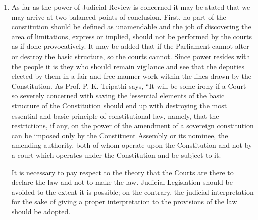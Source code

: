 \begin{multicols}{2}
\begin{enumerate}
\item As far as the power of Judicial Review is concerned it may be stated that we may
arrive at two balanced points of conclusion. First, no part of the constitution should
be defined as unamendable and the job of discovering the area of limitations,
express or implied, should not be performed by the courts as if done provocatively.
It may be added that if the Parliament cannot alter or destroy the basic structure, so
the courts cannot. Since power resides with the people it is they who should remain
vigilance and see that the deputies elected by them in a fair and free manner work
within the lines drawn by the Constitution. As Prof. P. K. Tripathi says, “It will be
some irony if a Court so severely concerned with saving the ‘essential elements of
the basic structure of the Constitution should end up with destroying the most
essential and basic principle of constitutional law, namely, that the restrictions, if
any, on the power of the amendment of a sovereign constitution can be imposed
only by the Constituent Assembly or its nominee, the amending authority, both of
whom operate upon the Constitution and not by a court which operates under the
Constitution and be subject to it. 
 
It is necessary to pay respect to the theory that the Courts are there to declare the law
and not to make the law. Judicial Legislation should be avoided to the extent it is
possible; on the contrary, the judicial interpretation for the sake of giving a proper
interpretation to the provisions of the law should be adopted.



\end{enumerate}
\end{multicols}
\label{end2016-art2}
